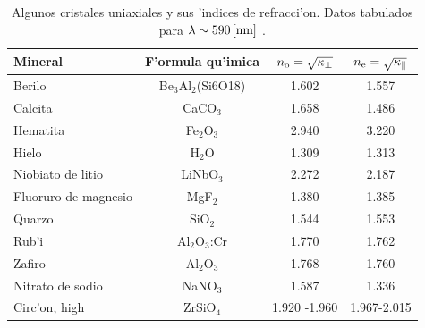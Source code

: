 \begin{table}[!h]
\begin{center}
\begin{tabular}{l c |c| c}
Mineral 		& 	F'ormula qu'imica 	&	$n_{\rm o}=\sqrt{\kappa_\perp}$	& 	$n_{\rm e}=\sqrt{\kappa_\parallel}$
\\
\hline\hline
Berilo 			& Be$_3$Al$_2$(Si6O18)	&	1.602	& 	1.557	
\\
Calcita 		&	CaCO$_3$  	&	1.658	& 	1.486	
\\
Hematita 		&	Fe$_2$O$_3$	&	2.940	& 	3.220	
\\
Hielo 			&	H$_2$O 		&	1.309	&	1.313	
\\
Niobiato de litio 	&	LiNbO$_3$	&	2.272	& 	2.187	
\\
Fluoruro de magnesio 	&	MgF$_2$		&	1.380	& 	1.385	
\\
Quarzo 			&	SiO$_2$		&	1.544	& 	1.553	
\\
Rub'i 			& Al$_2$O$_3$:Cr	&	1.770 	&	1.762	
\\
Zafiro	 		&	Al$_2$O$_3$	&	1.768	& 	1.760	
\\
Nitrato de sodio	&	NaNO$_3$	&	1.587	& 	1.336	
\\
Circ'on, high 		&	ZrSiO$_4$	&	1.920 -1.960	&  1.967-2.015	
\end{tabular}
\caption{Algunos cristales uniaxiales y sus 'indices de refracci'on. Datos tabulados para $\lambda\sim 590\,{\rm [nm]}$ \cite{hyper}.}
\end{center}
\end{table}

